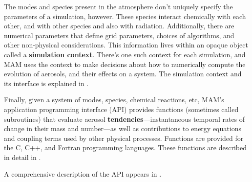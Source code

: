 The modes and species present in the atmosphere don't uniquely specify the
parameters of a simulation, however. These species interact chemically with each
other, and with other species and also with radiation.  Additionally, there are
numerical parameters that define grid parameters, choices of algorithms, and
other non-physical considerations. This information lives within an opaque
object called a {\bf simulation context}. There's one such context for each
simulation, and MAM uses the context to make decisions about how to numerically
compute the evolution of aerosols, and their effects on a system. The simulation
context and its interface is explained in .

Finally, given a system of modes, species, chemical reactions, etc, MAM's
application programming interface (API) provides functions (sometimes called
subroutines) that evaluate aerosol {\bf tendencies}---instantaneous temporal
rates of change in their mass and number---as well as contributions to energy
equations and coupling terms used by other physical processes. Functions are
provided for the C, C++, and Fortran programming languages. These functions are
described in detail in .

A comprehensive description of the API appears in .

